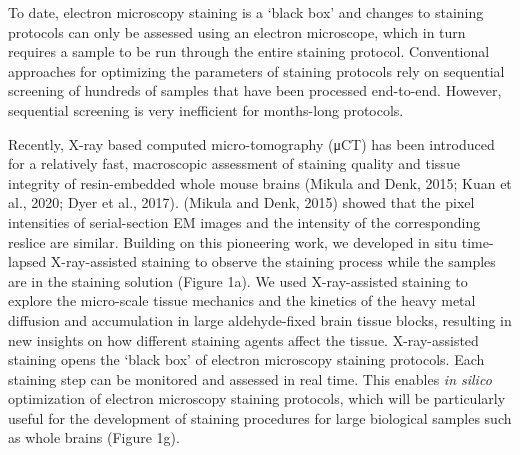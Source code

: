 \documentclass{article}
\begin{document}
To date, electron microscopy staining is a ‘black box’ and changes to staining protocols can only be assessed using an electron microscope, which in turn requires a sample to be run through the entire staining protocol. Conventional approaches for optimizing the parameters of staining protocols rely on sequential screening of hundreds of samples that have been processed end-to-end. However, sequential screening is very inefficient for months-long protocols.

Recently, X-ray based computed micro-tomography (μCT) has been introduced for a relatively fast, macroscopic assessment of staining quality and tissue integrity of resin-embedded whole mouse brains (Mikula and Denk, 2015; Kuan et al., 2020; Dyer et al., 2017). (Mikula and Denk, 2015) showed that the pixel intensities of serial-section EM images and the intensity of the corresponding reslice are similar. Building on this pioneering work, we developed in situ time-lapsed X-ray-assisted staining to observe the staining process while the samples are in the staining solution (Figure 1a). We used X-ray-assisted staining to explore the micro-scale tissue mechanics and the kinetics of the heavy metal diffusion and accumulation in large aldehyde-fixed brain tissue blocks, resulting in new insights on how different staining agents affect the tissue. X-ray-assisted staining opens the ‘black box’ of electron microscopy staining protocols. Each staining step can be monitored and assessed in real time. This enables \emph{in silico} optimization of electron microscopy staining protocols, which will be particularly useful for the development of staining procedures for large biological samples such as whole brains (Figure 1g).
\end{document}
